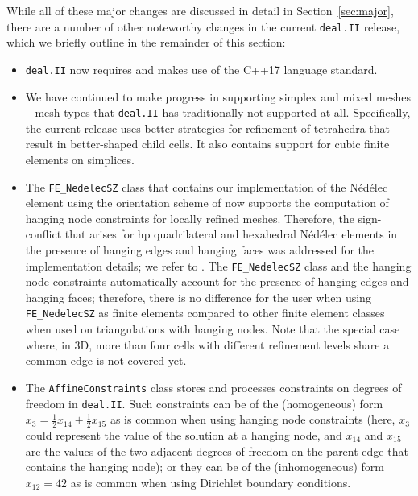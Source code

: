 \documentclass{ansarticle-preprint}
\newcommand{\specialword}[1]{\texttt{#1}}
\newcommand{\dealii}{{\specialword{deal.II}}\xspace}
\begin{document}
While all of these major changes are discussed in detail in
Section~\ref{sec:major}, there
are a number of other noteworthy changes in the current \dealii release,
which we briefly outline in the remainder of this section:
%
\begin{itemize}
  \item \dealii{} now requires and makes use of the C++17 language standard.
  \item We have continued to make progress in supporting simplex and
    mixed meshes -- mesh types that \dealii{} has traditionally not
    supported at all. Specifically, the current release uses
    better strategies for refinement of tetrahedra that result in
    better-shaped child cells. It also contains
    support for cubic finite elements on simplices.
   \item The \texttt{FE\_NedelecSZ} class that contains our 
    implementation of the N\'ed\'elec element using the orientation 
    scheme of \cite{Zag06} now supports the computation of hanging 
    node constraints for locally refined  meshes. 
    Therefore, the sign-conflict that arises for hp quadrilateral and 
    hexahedral N\'ed\'elec elements in the presence of hanging edges 
    and hanging faces was addressed for the implementation details; 
    we refer to \cite{Kinnewig2024}. 
    The \texttt{FE\_NedelecSZ} class and the hanging node constraints 
    automatically account for the presence of hanging edges and hanging 
    faces; therefore, there is no difference for the user when using 
    \texttt{FE\_NedelecSZ} as finite elements compared to other finite 
    element classes when used on triangulations with hanging nodes. 
    Note that the special case where, in 3D, more than four cells with 
    different refinement levels share a common edge is not covered yet.
  \item The \texttt{AffineConstraints} class stores and processes
    constraints on degrees of freedom in \dealii{}. Such constraints
    can be of the (homogeneous) form $x_3 = \frac 12 x_{14} + \frac 12 x_{15}$ as is
    common when using hanging node constraints (here, $x_3$ could
    represent the value of the solution at a hanging node, and $x_{14}$
    and $x_{15}$ are the values of the two adjacent degrees of freedom on
    the parent edge that contains the hanging node); or they can be of
    the (inhomogeneous) form $x_{12}=42$ as is common when using Dirichlet boundary
    conditions.


\end{itemize}
\end{document}
